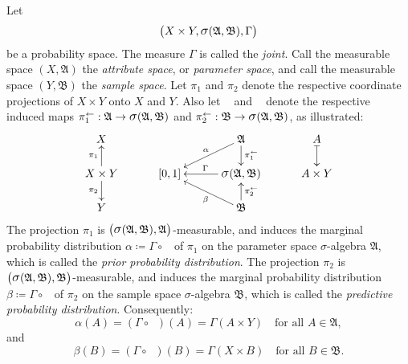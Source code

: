 \documentclass[
twoside=true,
paper=letter,
fontsize=9pt,
pagesize=auto,
leqno,
openany,
headsepline,
overfullrule,
]{scrbook}
\theoremstyle{plain}
\theoremstyle{plain}
\theoremstyle{definition}
\theoremstyle{bfnoteitalic}
\theoremstyle{bfnoteroman}
\newcommand{\sigalg}[1]{\mathfrak{#1}}
\newcommand{\definedby}{\coloneqq}
\newcommand{\sagb}{\mathop{\hbox{\large{$\sigma$}}}\nolimits}
\newcommand{\textsigma}{\hbox{\large{$\sigma$}}\kern-1pt}
\newcommand{\preimage}[1]{\mathop{#1^{\leftarrow}}}
\newcommand{\productsig}[2]{\sagb(#1,#2)}
\newcommand{\measurespace}{X}
\newcommand{\measurespaceii}{Y}
\newcommand{\seti}{A}
\newcommand{\projectionone}{\pi_1}
\newcommand{\projectiontwo}{\pi_2}
\newcommand{\pspace}{\measurespace}%
\newcommand{\sspace}{\measurespaceii}%
\newcommand{\pspaceset}{A}
\newcommand{\sspaceset}{B}
\newcommand{\sspacesig}{\sigalg{B}}
\newcommand{\pspacesig}{\sigalg{A}}
\newcommand{\measonprod}{\Gamma}%
\newcommand{\marginalone}{\alpha}%
\newcommand{\marginaltwo}{\beta}%
\newcommand{\prior}{\marginalone}
\newcommand{\predictive}{\marginaltwo}
\begin{document}
Let
\[
\bigl(\pspace\times\sspace,
\productsig{\pspacesig}{\sspacesig}, 
\measonprod\bigr)
\]
be a probability space.
The measure $\measonprod$ is called the \emph{joint}.
Call the measurable space $(\pspace, \pspacesig)$ the \emph{attribute space}, or \emph{parameter space}, and call the measurable space
$(\sspace, \sspacesig)$ the 
\emph{sample space}.
Let $\projectionone$ and $\projectiontwo$ denote the respective coordinate projections of 
$\pspace\times\sspace$ onto $\pspace$ and $\sspace$. Also let $\preimage{\projectionone}$ and 
$\preimage{\projectiontwo}$ denote the respective induced maps 
$\preimage{\projectionone}:\pspacesig\to\productsig{\pspacesig}{\sspacesig}$
and 
$\preimage{\projectiontwo}:\sspacesig\to\productsig{\pspacesig}{\sspacesig}$, as illustrated:
\[
\xymatrix@R=16pt@C=30pt{ 
\pspace
&
&
\pspacesig 
\ar[d]^-{\preimage{\projectionone}}
\ar[dl]_-{\marginalone}
& \seti \ar@{|->}[d]
\\
\pspace\times\sspace \ar[u]^-{\projectionone} \ar[d]_-{\projectiontwo} &
[0,1] &
\productsig{\pspacesig}{\sspacesig}  \ar[l]_\measonprod
& \seti\times\sspace
\\
\sspace 
&
&
\sspacesig
\ar[u]_-{\preimage{\projectiontwo}}
\ar[ul]^-{\marginaltwo}
\\
}
\]
The projection $\projectionone$ 
is
$\bigl( \productsig{\pspacesig}{\sspacesig}, \pspacesig \bigr)$\hyp{}measurable,
and induces the marginal probability distribution
$\marginalone\definedby\measonprod\circ\preimage{\projectionone}$ of $\projectionone$ on the parameter space
\textsigma-algebra $\pspacesig$, 
which is called the \emph{prior probability distribution}.
The projection $\projectiontwo$ 
is
$\bigl(\productsig{\pspacesig}{\sspacesig}, \sspacesig \bigr)$\hyp{}measurable,
and induces the marginal probability distribution
$\marginaltwo\definedby\measonprod\circ\preimage{\projectiontwo}$ of $\projectiontwo$ on the sample space
\textsigma-algebra $\sspacesig$, 
which is called the \emph{predictive probability distribution}.
Consequently:
\[
\prior(\pspaceset) 
= ( \measonprod\circ\preimage{\projectionone} ) (\pspaceset)
= \measonprod(\pspaceset\times\sspace)
\quad \text{for all $\pspaceset\in\pspacesig$},
\]
and
\[
\predictive(\sspaceset) 
= ( \measonprod\circ\preimage{\projectiontwo} ) (\sspaceset)
= \measonprod(\pspace\times\sspaceset)
\quad \text{for all $\sspaceset\in\sspacesig$}.
\]
\end{document}
